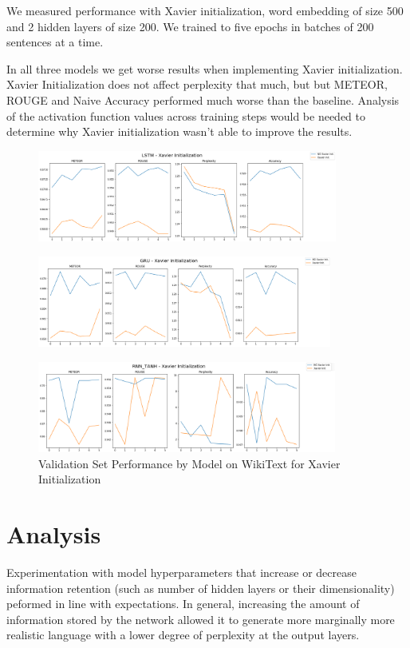 \documentclass[a4paper]{article}
\begin{document}
We measured performance with Xavier initialization, word embedding of size 500 and 2 hidden layers of size 200.
We trained to five epochs in batches of 200 sentences at a time.
 
In all three models we get worse results when implementing Xavier initialization. Xavier Initialization does not
affect perplexity that much, but but METEOR, ROUGE and Naive Accuracy performed much worse than the baseline.
Analysis of the activation function values across training steps would be needed to determine why Xavier
initialization wasn't able to improve the results.

\begin{figure}[!ht]
\includegraphics[width=\textwidth, height=3cm]{lstm-xi}
\centering
\end{figure}
\begin{figure}[!ht]
\includegraphics[width=\textwidth, height=3cm]{gru-xi}
\centering
\end{figure}
\begin{figure}[!ht]
\includegraphics[width=\textwidth, height=3cm]{tanh-xi}
\centering
\caption{Validation Set Performance by Model on WikiText for Xavier Initialization}
\end{figure}

\section{Analysis}
\label{sec:analysis}

Experimentation with model hyperparameters that increase or decrease information
retention (such as number of hidden layers or their dimensionality) peformed in line
with expectations. In general, increasing the amount of information stored by the network
allowed it to generate more marginally more realistic language with a lower degree of
perplexity at the output layers.
\end{document}
